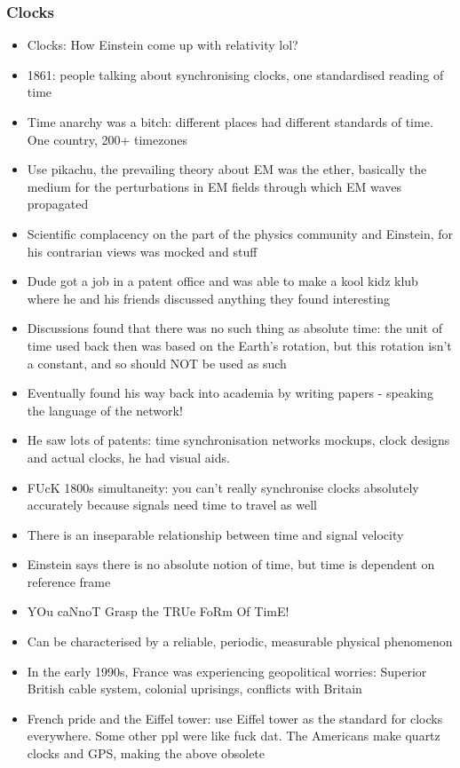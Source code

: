 \documentclass[a4paper]{article}
\begin{document}
\subsubsection{Clocks}
\begin{itemize}
	\item Clocks: How Einstein come up with relativity lol? 
	\item 1861: people talking about synchronising clocks, one standardised reading of time
	\item Time anarchy was a bitch: different places had different standards of time. One country, 200+ timezones
	\item Use pikachu, the prevailing theory about EM was the ether, basically the medium for the perturbations in EM fields through which EM waves propagated
	\item Scientific complacency on the part of the physics community and Einstein, for his contrarian views was mocked and stuff
	\item Dude got a job in a patent office and was able to make a kool kidz klub where he and his friends discussed anything they found interesting
	\item Discussions found that there was no such thing as absolute time: the unit of time used back then was based on the Earth's rotation, but this rotation isn’t a constant, and so should NOT be used as such
	\item Eventually found his way back into academia by writing papers - speaking the language of the network!
	\item He saw lots of patents: time synchronisation networks mockups, clock designs and actual clocks, he had visual aids.
	\item FUcK 1800s simultaneity: you can't really synchronise clocks absolutely accurately because signals need time to travel as well
	\item There is an inseparable relationship between time and signal velocity
	\item Einstein says there is no absolute notion of time, but time is dependent on reference frame
	\item YOu caNnoT Grasp the TRUe FoRm Of TimE! 
	\item Can be characterised by a reliable, periodic, measurable physical phenomenon
	\item In the early 1990s, France was experiencing geopolitical worries: Superior British cable system, colonial uprisings, conflicts with Britain
	\item French pride and the Eiffel tower: use Eiffel tower as the standard for clocks everywhere. Some other ppl were like fuck dat. The Americans make quartz clocks and GPS, making the above obsolete 

\end{itemize}
\end{document}

